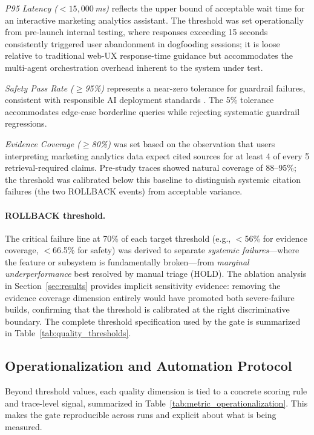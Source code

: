 \textit{P95 Latency ($< 15{,}000$\,ms)} reflects the upper bound of acceptable wait time for an interactive marketing analytics assistant. The threshold was set operationally from pre-launch internal testing, where responses exceeding 15 seconds consistently triggered user abandonment in dogfooding sessions; it is loose relative to traditional web-UX response-time guidance but accommodates the multi-agent orchestration overhead inherent to the system under test.

\textit{Safety Pass Rate ($\ge$95\%)} represents a near-zero tolerance for guardrail failures, consistent with responsible AI deployment standards \cite{bai2022constitutional}. The 5\% tolerance accommodates edge-case borderline queries while rejecting systematic guardrail regressions.

\textit{Evidence Coverage ($\ge$80\%)} was set based on the observation that users interpreting marketing analytics data expect cited sources for at least 4 of every 5 retrieval-required claims. Pre-study traces showed natural coverage of 88--95\%; the threshold was calibrated below this baseline to distinguish systemic citation failures (the two ROLLBACK events) from acceptable variance.

\paragraph{ROLLBACK threshold.}
The critical failure line at 70\% of each target threshold (e.g., $<$56\% for evidence coverage, $<$66.5\% for safety) was derived to separate \textit{systemic failures}---where the feature or subsystem is fundamentally broken---from \textit{marginal underperformance} best resolved by manual triage (HOLD). The ablation analysis in Section~\ref{sec:results} provides implicit sensitivity evidence: removing the evidence coverage dimension entirely would have promoted both severe-failure builds, confirming that the threshold is calibrated at the right discriminative boundary.
The complete threshold specification used by the gate is summarized in Table~\ref{tab:quality_thresholds}.



\subsection{Operationalization and Automation Protocol}
Beyond threshold values, each quality dimension is tied to a concrete scoring rule and trace-level signal, summarized in Table~\ref{tab:metric_operationalization}. This makes the gate reproducible across runs and explicit about what is being measured.

